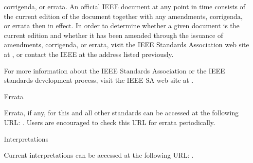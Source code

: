 \thispagestyle{hlafrontroman}
\begingroup
\setlength{\parindent}{0pt}
\setlength{\parskip}{0pt}
\frontBody
\vspace*{-12.9pt}

corrigenda, or errata. An official IEEE document at any point in time consists of the current edition of the\linebreak
document together with any amendments, corrigenda, or errata then in effect. In order to determine whether\linebreak
a given document is the current edition and whether it has been amended through the issuance of\linebreak
amendments, corrigenda, or errata, visit the IEEE Standards Association web site at \linebreak
{}, or contact the IEEE at the address listed previously.\par

\vspace{12.3pt}
For more information about the IEEE Standards Association or the IEEE standards development process,\linebreak
visit the IEEE-SA web site at .\par

\vspace{17.75pt}
{\frontSectionHeading Errata\par}

\vspace{12.45pt}
Errata, if any, for this and all other standards can be accessed at the following URL: \linebreak
{}. Users are encouraged to check this URL for errata\linebreak
periodically.\par

\vspace{17.78pt}
{\frontSectionHeading Interpretations\par}

\vspace{12.45pt}
Current interpretations can be accessed at the following URL: \linebreak
{}.\par

